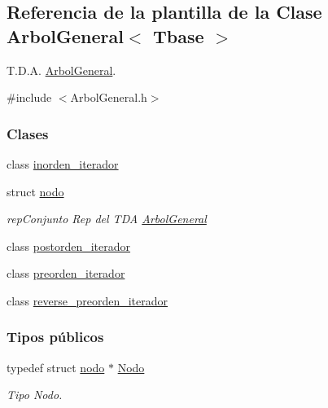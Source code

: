 \hypertarget{classArbolGeneral}{}\subsection{Referencia de la plantilla de la Clase Arbol\+General$<$ Tbase $>$}
\label{classArbolGeneral}


T.\+D.\+A. \hyperlink{classArbolGeneral}{Arbol\+General}.  




{\ttfamily \#include $<$Arbol\+General.\+h$>$}

\subsubsection*{Clases}
\begin{DoxyCompactItemize}
\item 
class \hyperlink{classArbolGeneral_1_1inorden__iterador}{inorden\+\_\+iterador}
\item 
struct \hyperlink{structArbolGeneral_1_1nodo}{nodo}
\begin{DoxyCompactList}\small\item\em rep\+Conjunto Rep del T\+DA \hyperlink{classArbolGeneral}{Arbol\+General} \end{DoxyCompactList}\item 
class \hyperlink{classArbolGeneral_1_1postorden__iterador}{postorden\+\_\+iterador}
\item 
class \hyperlink{classArbolGeneral_1_1preorden__iterador}{preorden\+\_\+iterador}
\item 
class \hyperlink{classArbolGeneral_1_1reverse__preorden__iterador}{reverse\+\_\+preorden\+\_\+iterador}
\end{DoxyCompactItemize}
\subsubsection*{Tipos públicos}
\begin{DoxyCompactItemize}
\item 
typedef struct \hyperlink{structArbolGeneral_1_1nodo}{nodo} $\ast$ \hyperlink{classArbolGeneral_a12cc1b74a9095d89bc7334290d332f7a}{Nodo}
\begin{DoxyCompactList}\small\item\em Tipo Nodo. \end{DoxyCompactList}\end{DoxyCompactItemize}
